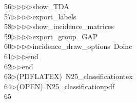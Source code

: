 \begin{tabbing}
56\>$\triangleright$\>$\triangleright$\>$\triangleright$\>$\triangleright$\>show\_TDA\ \\[0pt]
57\>$\triangleright$\>$\triangleright$\>$\triangleright$\>$\triangleright$\>export\_labels\ \\[0pt]
58\>$\triangleright$\>$\triangleright$\>$\triangleright$\>$\triangleright$\>show\_incidence\_matrices\ \\[0pt]
59\>$\triangleright$\>$\triangleright$\>$\triangleright$\>$\triangleright$\>export\_group\_GAP\ \\[0pt]
60\>$\triangleright$\>$\triangleright$\>$\triangleright$\>$\triangleright$\>incidence\_draw\_options\ Doinc\ \\[0pt]
61\>$\triangleright$\>$\triangleright$\>$\triangleright$\>end\ \\[0pt]
62\>$\triangleright$\>$\triangleright$\>end\\[0pt]
63\>$\triangleright$\>(PDFLATEX)\ N25\_classificationtex\\[0pt]
64\>$\triangleright$\>(OPEN)\ N25\_classificationpdf\\[0pt]
65\>\end{tabbing}
